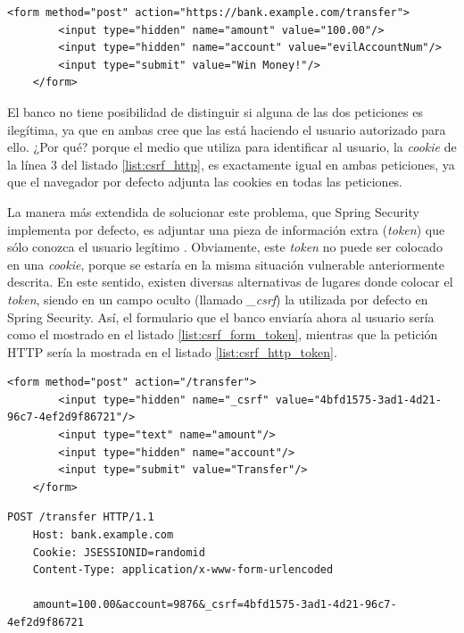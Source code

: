 \documentclass[a4paper,12pt,twoside,openright]{report}
\begin{document}
	\begin{lstlisting}[caption=Formulario para la transferencia ilegítima de fondos,label=list:csrf_form_evil]
	<form method="post" action="https://bank.example.com/transfer">
		<input type="hidden" name="amount" value="100.00"/>
		<input type="hidden" name="account" value="evilAccountNum"/>
		<input type="submit" value="Win Money!"/>
	</form>
	\end{lstlisting}
	
	El banco no tiene posibilidad de distinguir si alguna de las dos peticiones es ilegítima, ya que en ambas cree que las está haciendo el usuario autorizado para ello. ¿Por qué? porque el medio que utiliza para identificar al usuario, la \emph{cookie} de la línea 3 del listado \ref{list:csrf_http}, es exactamente igual en ambas peticiones, ya que el navegador por defecto adjunta las cookies en todas las peticiones.
	
	La manera más extendida de solucionar este problema, que Spring Security implementa por defecto, es adjuntar una pieza de información extra (\emph{token}) que sólo conozca el usuario legítimo \cite{Alex2020}. Obviamente, este \emph{token} no puede ser colocado en una \emph{cookie}, porque se estaría en la misma situación vulnerable anteriormente descrita. En este sentido, existen diversas alternativas de lugares donde colocar el \emph{token}, siendo en un campo oculto (llamado \emph{\_csrf}) la utilizada por defecto en Spring Security. Así, el formulario que el banco enviaría ahora al usuario sería como el mostrado en el listado \ref{list:csrf_form_token}, mientras que la petición HTTP sería la mostrada en el listado \ref{list:csrf_http_token}.
	\\
	
	\begin{lstlisting}[caption=Formulario seguro para la transferencia de fondos,label=list:csrf_form_token]
	<form method="post" action="/transfer">
		<input type="hidden" name="_csrf" value="4bfd1575-3ad1-4d21-96c7-4ef2d9f86721"/>
		<input type="text" name="amount"/>
		<input type="hidden" name="account"/>
		<input type="submit" value="Transfer"/>
	</form>
	\end{lstlisting}
	
	\begin{lstlisting}[caption=Petición HTTP segura para la transferencia de fondos,label=list:csrf_http_token]
	 POST /transfer HTTP/1.1
	Host: bank.example.com
	Cookie: JSESSIONID=randomid
	Content-Type: application/x-www-form-urlencoded
	
	amount=100.00&account=9876&_csrf=4bfd1575-3ad1-4d21-96c7- 4ef2d9f86721
	\end{lstlisting}
	
\end{document}
